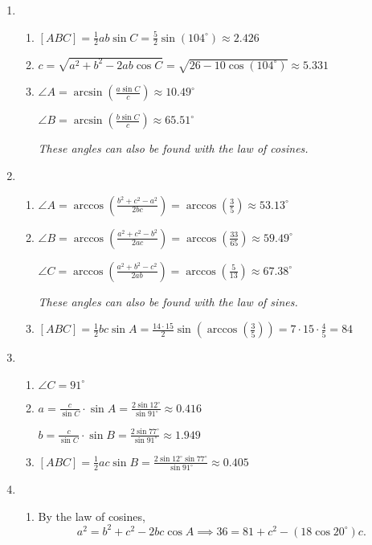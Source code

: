 \begin{enumerate}
\item \begin{enumerate}
\item $[ABC] = \frac{1}{2}ab\sin C = \frac{5}{2}\sin(104^{\circ})\approx 2.426$
\item $c = \sqrt{a^2 + b^2 - 2ab\cos C} = \sqrt{26 - 10\cos(104^{\circ})}\approx 5.331$
\item $\angle A = \arcsin(\frac{a\sin C}{c})\approx 10.49^{\circ}$\par 
$\angle B = \arcsin(\frac{b\sin C}{c})\approx 65.51^{\circ}$\par
\emph{These angles can also be found with the law of cosines.}
\end{enumerate}
\item \begin{enumerate}
\item $\angle A = \arccos(\frac{b^2 + c^2 - a^2}{2bc}) = \arccos(\frac{3}{5})\approx 53.13^{\circ}$
\item $\angle B = \arccos(\frac{a^2 + c^2 - b^2}{2ac}) = \arccos(\frac{33}{65})\approx 59.49^{\circ}$\par 
$\angle C = \arccos(\frac{a^2 + b^2 - c^2}{2ab}) = \arccos(\frac{5}{13})\approx 67.38^{\circ}$\par
\emph{These angles can also be found with the law of sines.}
\item $[ABC] = \frac{1}{2}bc\sin A = \frac{14\cdot 15}{2}\sin(\arccos(\frac{3}{5})) = 7\cdot 15\cdot\frac{4}{5} = 84$
\end{enumerate}
\item \begin{enumerate}
\item $\angle C = 91^{\circ}$
\item $a = \frac{c}{\sin C}\cdot\sin A = \frac{2\sin 12^{\circ}}{\sin 91^{\circ}}\approx 0.416$\par
$b = \frac{c}{\sin C}\cdot\sin B = \frac{2\sin 77^{\circ}}{\sin 91^{\circ}}\approx 1.949$
\item $[ABC] = \frac{1}{2}ac\sin B = \frac{2\sin 12^{\circ}\sin 77^{\circ}}{\sin 91^{\circ}}\approx 0.405$
\end{enumerate}
\item \begin{enumerate}
\item By the law of cosines,
\begin{equation*}
a^2 = b^2 + c^2 - 2bc\cos A\implies 36 = 81 + c^2 - (18\cos 20^{\circ})c.
\end{equation*}

\end{enumerate}
\end{enumerate}
